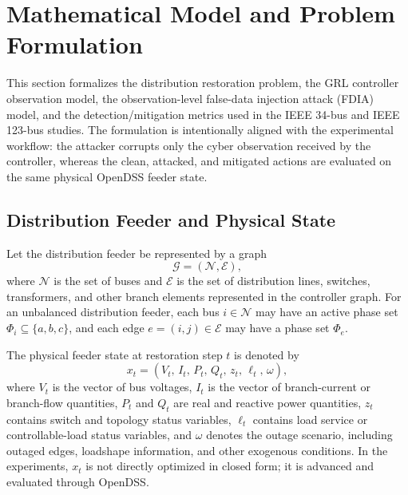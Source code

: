 % 

\section{Mathematical Model and Problem Formulation}
\label{sec:mathematical_model}

This section formalizes the distribution restoration problem, the GRL controller observation model, the observation-level false-data injection attack (FDIA) model, and the detection/mitigation metrics used in the IEEE 34-bus and IEEE 123-bus studies. The formulation is intentionally aligned with the experimental workflow: the attacker corrupts only the cyber observation received by the controller, whereas the clean, attacked, and mitigated actions are evaluated on the same physical OpenDSS feeder state.

\subsection{Distribution Feeder and Physical State}
\label{subsec:feeder_model}

Let the distribution feeder be represented by a graph
\begin{equation}
    \mathcal{G} = (\mathcal{N},\mathcal{E}),
\end{equation}
where $\mathcal{N}$ is the set of buses and $\mathcal{E}$ is the set of distribution lines, switches, transformers, and other branch elements represented in the controller graph. For an unbalanced distribution feeder, each bus $i \in \mathcal{N}$ may have an active phase set $\Phi_i \subseteq \{a,b,c\}$, and each edge $e=(i,j) \in \mathcal{E}$ may have a phase set $\Phi_e$.

The physical feeder state at restoration step $t$ is denoted by
\begin{equation}
    x_t =
    \left(
        V_t,\,
        I_t,\,
        P_t,\,
        Q_t,\,
        z_t,\,
        \ell_t,\,
        \omega
    \right),
\end{equation}
where $V_t$ is the vector of bus voltages, $I_t$ is the vector of branch-current or branch-flow quantities, $P_t$ and $Q_t$ are real and reactive power quantities, $z_t$ contains switch and topology status variables, $\ell_t$ contains load service or controllable-load status variables, and $\omega$ denotes the outage scenario, including outaged edges, loadshape information, and other exogenous conditions. In the experiments, $x_t$ is not directly optimized in closed form; it is advanced and evaluated through OpenDSS.


